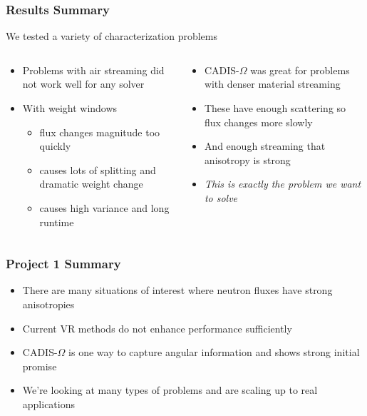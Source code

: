 \documentclass[xcolor=x11names,compress]{beamer}
\renewcommand{\(}{\begin{columns}}
\renewcommand{\)}{\end{columns}}
\newcommand{\<}[1]{\begin{column}{#1}}
\renewcommand{\>}{\end{column}}
\begin{document}
\begin{frame}[fragile]

  \frametitle{Results Summary}

    We tested a variety of characterization problems  
    \begin{columns}
    \begin{column}{0.5\textwidth}
    \begin{itemize}
       \item Problems with air streaming did not work well for any solver
       \item With weight windows
       \begin{itemize}
         \item flux changes magnitude too quickly
         \item causes lots of splitting and dramatic weight change
         \item causes high variance and long runtime
       \end{itemize}       
    \end{itemize}
    \end{column}    

    \begin{column}{0.5\textwidth}
    \begin{itemize}
       \item CADIS-$\Omega$ was great for problems with denser material streaming 
       \item These have enough scattering so flux changes more slowly
       \item And enough streaming that anisotropy is strong
       \item \textit{This is exactly the problem we want to solve}
    \end{itemize}   
    \end{column}
    \end{columns}   

\end{frame}

\begin{frame}[fragile]
  \frametitle{Project 1 Summary}
  \begin{itemize}
  \item There are many situations of interest where neutron fluxes have strong anisotropies
  \item Current VR methods do not enhance performance sufficiently 
  \pause
  \item CADIS-$\Omega$ is one way to capture angular information and shows strong initial promise
  \pause
  \item We're looking at many types of problems and are scaling up to real applications
  \end{itemize}
\end{frame}
\end{document}
